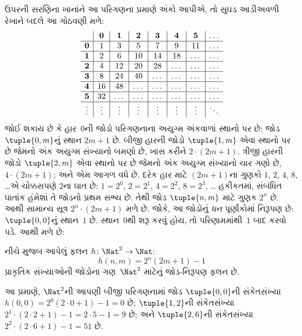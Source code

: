 \begin{explain}
\[\]
ઉપરની સરણિના ખાનાંને આ પરિગણના પ્રમાણે અંકો
આપીએ, તો સુઘડ આડીઅવળી રેખાને બદલે આ ગોઠવણી મળે:
\[
\begin{array}{ c | c | c | c | c | c | c | c }
& \mathbf 0 & \mathbf 1 & \mathbf 2 & \mathbf 3 & \mathbf 4 & \mathbf 5 & \dots \\
\hline
\mathbf 0 & 1 & 3 & 5 & 7 & 9 & 11 & \dots \\
\hline
\mathbf 1 & 2 & 6 & 10 & 14 & 18 & \dots & \dots \\
\hline
\mathbf 2 & 4 & 12 & 20 & 28 & \dots & \dots & \dots \\
\hline
\mathbf 3 & 8 & 24 & 40 & \dots & \dots & \dots & \dots \\
\hline
\mathbf 4 & 16 & 48 & \dots & \dots & \dots & \dots & \dots \\
\hline
\mathbf 5 & 32 & \dots & \dots & \dots & \dots & \dots & \dots \\
\hline
\vdots & \vdots & \vdots & \vdots & \vdots & \vdots & \vdots & \ddots\\
\end{array}
\]
જોઈ શકાય છે કે હાર~$0$ની જોડો પરિગણનાના અયુગ્મ
અંકવાળાં સ્થાનો પર છે: જોડ $\tuple{0,m}$નું સ્થાન
$2m+1$ છે. બીજી હારની જોડો $\tuple{1,m}$ એવા
સ્થાનો પર છે જેમનો અંક અયુગ્મ સંખ્યાનો બમણો છે,
ખાસ કરીને $2 \cdot (2m+1)$.
ત્રીજી હારની જોડો $\tuple{2,m}$ એવા સ્થાનો પર
છે જેમનો અંક અયુગ્મ સંખ્યાનો ચાર ગણો છે,
$4 \cdot (2m+1)$; અને એમ આગળ વધે છે.
દરેક હાર માટે $(2m+1)$ના ગુણકો
$1$, $2$, $4$, $8$, \dots એ ચોક્કસપણે
$2$ના ઘાત છે: $1= 2^0$, $2 = 2^1$,
$4 = 2^2$, $8 = 2^3$, \dots\@
હકીકતમાં, સંબંધિત ઘાતાંક હંમેશાં તે જોડનો પ્રથમ
સભ્ય છે. તેથી જોડ $\tuple{n,m}$ માટે ગુણક
$2^n$ છે. આથી સામાન્ય સૂત્ર $2^n \cdot (2m+1)$
મળે છે. જોકે, આ જોડોનું \emph{ધન} પૂર્ણાંકોમાં
નિરૂપણ છે: $\tuple{0,0}$નું સ્થાન~$1$ છે.
સ્થાન~$0$થી શરૂ કરવું હોય, તો પરિણામમાંથી~$1$
બાદ કરવો પડે. આથી મળે છે:
\end{explain}

\begin{ex}
નીચે મુજબ આપેલું ફલન $h\colon \Nat^2 \to \Nat$:
\[
h(n,m) = 2^n (2m+1) - 1
\]
પ્રાકૃતિક સંખ્યાઓની જોડોના ગણ~$\Nat^2$ માટેનું
જોડ-નિરૂપણ ફલન છે.
\end{ex}

\begin{explain}
આ પ્રમાણે, $\Nat^2$ની આપણી બીજી પરિગણનામાં
જોડ $\tuple{0,0}$ની સંકેતસંખ્યા
$h(0,0) = 2^0(2\cdot 0+1) - 1 = 0$ છે;
$\tuple{1,2}$ની સંકેતસંખ્યા
$2^{1} \cdot (2 \cdot 2 + 1) - 1 = 2
\cdot 5 - 1 = 9$ છે; અને $\tuple{2,6}$ની
સંકેતસંખ્યા $2^{2} \cdot (2
\cdot 6 + 1) - 1 = 51$ છે.
\end{explain}

